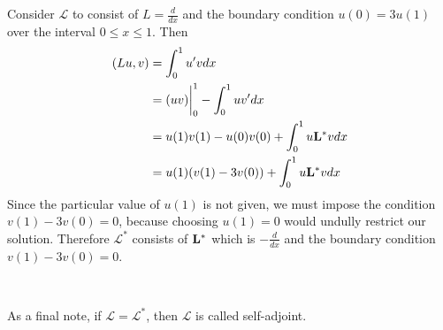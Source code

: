 \begin{example}
	Consider \(\mathcal{L}\) to consist of \(L=\frac{d}{dx}\) and the boundary condition \(u(0)=3u(1)\) over the interval \(0\leq x \leq 1\). Then
	\begin{equation}
		\begin{split}
			(Lu,v) &= \int_0^1u'vdx\\
			       &= (uv)\biggr\rvert_0^1 - \int_0^1 uv'dx\\
			       &= u(1)v(1)-u(0)v(0)+\int_0^1u\mathrm{\bf{L^*}} vdx\\
			       &= u(1)(v(1)-3v(0)) + \int_0^1u\mathrm{\bf{L^*}} vdx
		\end{split}
	\end{equation}
	Since the particular value of \(u(1)\) is not given, we must impose the condition \(v(1)-3v(0)=0\), because choosing \(u(1)=0\) would undully restrict our solution. Therefore \(\mathcal{L^*}\) consists of \(\mathrm{\bf{L^*}} \) which is \(-\frac{d}{dx}\) and the boundary condition \(v(1) - 3v(0)=0\). 
\end{example}

\

As a final note, if \(\mathcal{L}=\mathcal{L}^*\), then \(\mathcal{L}\) is called self-adjoint.

